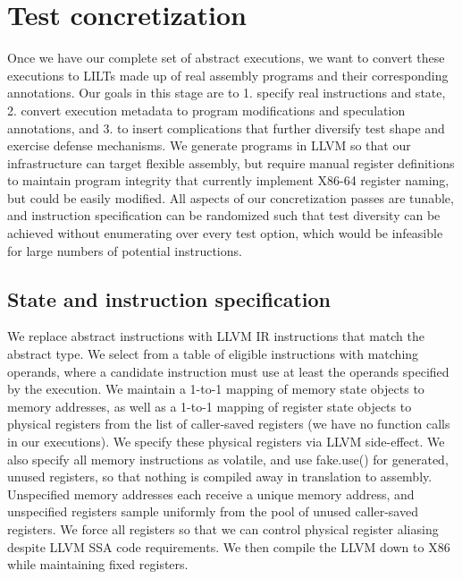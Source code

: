 

\section{Test concretization}
Once we have our complete set of abstract executions, we want to convert these executions to LILTs made up of real assembly programs and their corresponding annotations. Our goals in this stage are to 1. specify real instructions and state, 2. convert execution metadata to program modifications and speculation annotations, and 3. to insert complications that further diversify test shape and exercise defense mechanisms. We generate programs in LLVM so that our infrastructure can target flexible assembly, but require manual register definitions to maintain program integrity that currently implement X86-64 register naming, but could be easily modified. All aspects of our concretization passes are tunable, and instruction specification can be randomized such that test diversity can be achieved without enumerating over every test option, which would be infeasible for large numbers of potential instructions. 

\subsection{State and instruction specification}
We replace abstract instructions with LLVM IR instructions that match the abstract type. We select from a table of eligible instructions with matching operands, where a candidate instruction must use at least the operands specified by the execution. We maintain a 1-to-1 mapping of memory state objects to memory addresses, as well as a 1-to-1 mapping of register state objects to physical registers from the list of caller-saved registers (we have no function calls in our executions). We specify these physical registers via LLVM side-effect. We also specify all memory instructions as volatile, and use fake.use() for generated, unused registers, so that nothing is compiled away in translation to assembly. Unspecified memory addresses each receive a unique memory address, and unspecified registers sample uniformly from the pool of unused caller-saved registers. We force all registers so that we can control physical register aliasing despite LLVM SSA code requirements. We then compile the LLVM down to X86 while maintaining fixed registers.  

